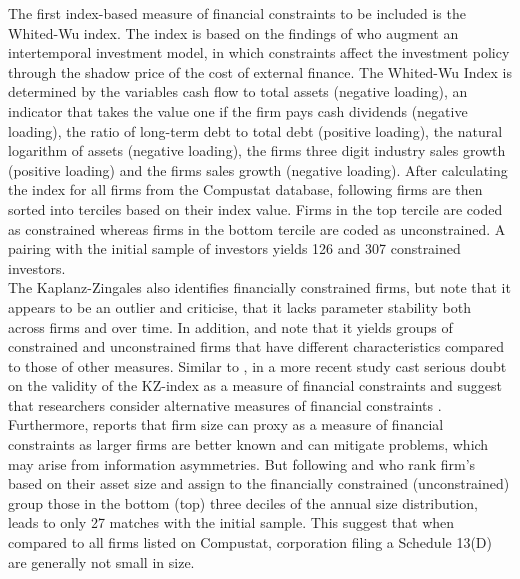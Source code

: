 \documentclass[12pt]{article}
\begin{document}
The first index-based measure of financial constraints to be included is the Whited-Wu index. The index is based on the findings of \citet[p.543]{Whited2006} who augment an intertemporal investment model, in which constraints affect the investment policy through the shadow price of the cost of external finance. The Whited-Wu Index is determined by the variables cash flow to total assets (negative loading), an indicator that takes the value one if the firm pays cash dividends (negative loading), the ratio of long-term debt to total debt (positive loading), the natural logarithm of assets (negative loading), the firms three digit industry sales growth (positive loading) and the firms sales growth (negative loading). After calculating the index for all firms from the Compustat database, following \citet[p.38]{Farre-mensa2013} firms are then sorted into terciles based on their index value. Firms in the top tercile are coded as constrained whereas firms in the bottom tercile are coded as unconstrained. A pairing with the initial sample of investors yields 126 and 307 constrained investors.\\
The Kaplanz-Zingales also identifies financially constrained firms, but \citet[p.29]{Farre-mensa2013} note that it appears to be an outlier and \citet{Whited2006} criticise, that it lacks parameter stability both across firms and over time. In addition, \citet[p.111]{Khatami2014} and \citet[p.1779]{Almeida2004} note that it yields groups of constrained and unconstrained firms that have different characteristics compared to those of other measures. Similar to \citet[p.546]{Whited2006}, in a more recent study \citet[p.1909]{hadlock2010} cast serious doubt on the validity of the KZ-index as a measure of financial constraints and suggest that researchers consider alternative measures of financial constraints \citep[p.1938]{hadlock2010}.\\
Furthermore, \citet[p.15]{heller2015} reports that firm size can proxy as a measure of financial constraints as larger firms are better known and can mitigate problems, which may arise from information asymmetries. But following \citet[p.1790]{Almeida2004} and \citet[p.215]{Moeller2004} who rank firm's based on their asset size and assign to the financially constrained (unconstrained) group those in the bottom (top) three deciles of the annual size distribution, leads to only 27 matches with the initial sample. This suggest that when compared to all firms listed on Compustat, corporation filing a Schedule 13(D) are generally not small in size. 
\end{document}
